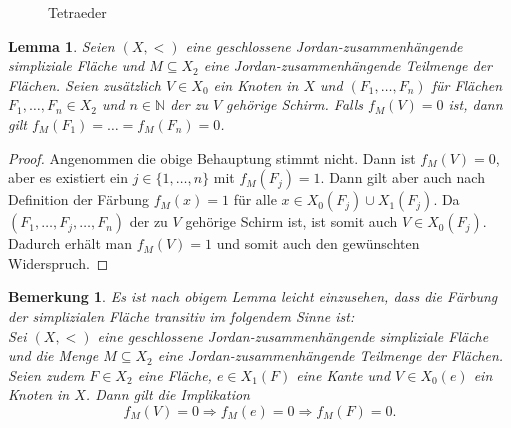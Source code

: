 \documentclass[12pt,titlepage,twoside,cleardoublepage]{article}
\theoremstyle{nummermitklammern}
\newtheorem{lemma}[temp]{Lemma}
\newtheorem{bemerkung}[temp]{Bemerkung}
\newtheorem{lemma}[zahl]{Lemma}
\newtheorem{bemerkung}[zahl]{Bemerkung}
\numberwithin{equation}{section}
\begin{document}
\begin{figure}[H]

 \caption{Tetraeder }
 \label{Tetraeder}
 \end{figure}
\begin{lemma}\label{jordanV}
Seien $(X,<)$ eine geschlossene Jordan-zusammenhängende simpliziale Fläche und $M \subseteq X_2$ eine Jordan-zusammenhängende Teilmenge der Flächen. Seien zusätzlich $V\in X_0$ ein Knoten in $X$ und $(F_1,\ldots,F_n)$ für Flächen $F_1,\ldots,F_n \in X_2$ und $n \in \mathbb{N}$ der zu $V$ gehörige Schirm. Falls $f_M(V)=0$ ist, dann gilt $f_M(F_1)=\ldots=f_M(F_n)=0$.
\end{lemma}
\begin{proof}
Angenommen die obige Behauptung stimmt nicht. Dann ist $f_M(V)=0$, aber es existiert ein $j\in \{1,\ldots,n\}$ mit $f_M(F_j)=1$. Dann gilt aber auch nach Definition der Färbung $f_M(x)=1$ für alle $x \in X_0(F_j)\cup X_1(F_j)$. Da $(F_1,\ldots,F_j,\ldots,F_n)$ der zu $V$ gehörige Schirm ist, ist somit auch $V\in X_0(F_j)$. Dadurch erhält man $f_M(V)=1$ und somit auch den gewünschten Widerspruch.
\end{proof}
\begin{bemerkung}
Es ist nach obigem Lemma leicht einzusehen, dass die Färbung der simplizialen Fläche transitiv im folgendem Sinne ist:\\
Sei $(X,<)$ eine geschlossene Jordan-zusammenhängende simpliziale Fläche und die Menge $M \subseteq X_2$ eine Jordan-zusammenhängende Teilmenge der Flächen. Seien zudem $F\in X_2$ eine Fläche, $e\in X_1(F)$ eine Kante und $V\in X_0(e)$ ein Knoten in $X$. Dann gilt die Implikation 
\[
f_M(V)=0 \Rightarrow f_M(e)=0 \Rightarrow f_M(F)=0.
\]
\end{bemerkung}
\end{document}
